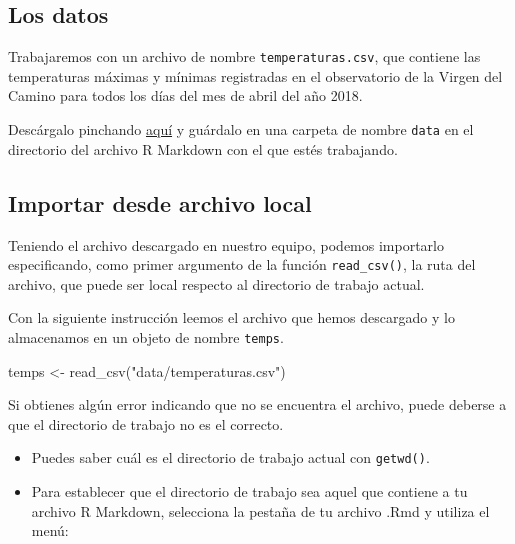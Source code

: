 \documentclass[
  title=normal,
  notoc,
  bib=normal]{mnye}
\newenvironment{Shaded}{\begin{snugshade}}{\end{snugshade}}
\newcommand{\FunctionTok}[1]{\textcolor[rgb]{0.00,0.00,0.00}{#1}}
\newcommand{\NormalTok}[1]{#1}
\newcommand{\OtherTok}[1]{\textcolor[rgb]{0.56,0.35,0.01}{#1}}
\newcommand{\StringTok}[1]{\textcolor[rgb]{0.31,0.60,0.02}{#1}}
\begin{document}
\hypertarget{los-datos}{%
\subsection{Los datos}\label{los-datos}}

Trabajaremos con un archivo de nombre \texttt{temperaturas.csv}, que contiene las temperaturas máximas y mínimas registradas en el observatorio de la Virgen del Camino para todos los días del mes de abril del año 2018.

Descárgalo pinchando \href{https://drive.google.com/uc?export=download\&id=1xDIvAcQSS4_dFoSIO2hcprhqnbXJqx9r}{aquí} y guárdalo en una carpeta de nombre \texttt{data} en el directorio del archivo R Markdown con el que estés trabajando.

\hypertarget{importar-desde-archivo-local}{%
\subsection{Importar desde archivo local}\label{importar-desde-archivo-local}}

Teniendo el archivo descargado en nuestro equipo, podemos importarlo especificando, como primer argumento de la función \texttt{read\_csv()}, la ruta del archivo, que puede ser local respecto al directorio de trabajo actual.

Con la siguiente instrucción leemos el archivo que hemos descargado y lo almacenamos en un objeto de nombre \texttt{temps}.

\begin{Shaded}
\begin{Highlighting}[]
\NormalTok{temps }\OtherTok{\textless{}{-}} \FunctionTok{read\_csv}\NormalTok{(}\StringTok{"data/temperaturas.csv"}\NormalTok{)}
\end{Highlighting}
\end{Shaded}

Si obtienes algún error indicando que no se encuentra el archivo, puede deberse a que el directorio de trabajo no es el correcto.

\begin{itemize}
\item
  Puedes saber cuál es el directorio de trabajo actual con \texttt{getwd()}.
\item
  Para establecer que el directorio de trabajo sea aquel que contiene a tu archivo R Markdown, selecciona la pestaña de tu archivo .Rmd y utiliza el menú:
\end{itemize}
\end{document}
